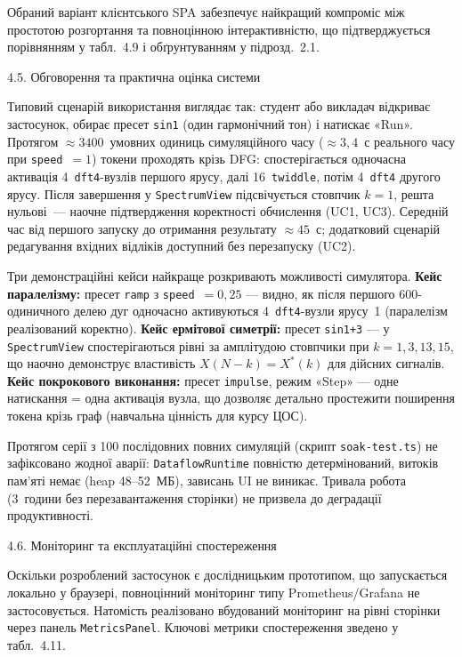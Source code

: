 Обраний варіант клієнтського SPA забезпечує найкращий компроміс між
простотою розгортання та повноцінною інтерактивністю, що підтверджується
порівнянням у табл.~4.9 і обґрунтуванням у підрозд.~2.1.

\protect{}\label{_Toc229681182}{}4.5. Обговорення та
практична оцінка системи

Типовий сценарій використання виглядає так: студент або викладач
відкриває застосунок, обирає пресет \texttt{sin1} (один гармонічний
тон) і натискає «Run». Протягом \(\approx3400\)~умовних одиниць
симуляційного часу (\(\approx3{,}4\)~с реального часу при
\texttt{speed}~\(=1\)) токени проходять крізь DFG: спостерігається
одночасна активація 4~\texttt{dft4}-вузлів першого ярусу, далі
16~\texttt{twiddle}, потім 4~\texttt{dft4} другого ярусу. Після
завершення у \texttt{SpectrumView} підсвічується стовпчик \(k=1\),
решта нульові~--- наочне підтвердження коректності обчислення (UC1,
UC3). Середній час від першого запуску до отримання результату
\(\approx45\)~с; додатковий сценарій редагування вхідних відліків
доступний без перезапуску (UC2).

Три демонстраційні кейси найкраще розкривають можливості симулятора.
\textbf{Кейс паралелізму:} пресет \texttt{ramp} з \texttt{speed}~\(=0{,}25\) ---
видно, як після першого 600-одиничного делею дуг одночасно активуються
4~\texttt{dft4}-вузли ярусу~1 (паралелізм реалізований коректно).
\textbf{Кейс ермітової симетрії:} пресет \texttt{sin1+3} --- у
\texttt{SpectrumView} спостерігаються рівні за амплітудою стовпчики при
\(k=1,3,13,15\), що наочно демонструє властивість \(X(N-k)=X^*(k)\) для
дійсних сигналів. \textbf{Кейс покрокового виконання:} пресет
\texttt{impulse}, режим «Step» --- одне натискання = одна активація
вузла, що дозволяє детально простежити поширення токена крізь граф
(навчальна цінність для курсу ЦОС).

Протягом серії з 100 послідовних повних симуляцій (скрипт
\texttt{soak-test.ts}) не зафіксовано жодної аварії:
\texttt{DataflowRuntime} повністю детермінований, витоків пам'яті немає
(heap 48--52~МБ), зависань UI не виникає. Тривала робота (3~години без
перезавантаження сторінки) не призвела до деградації продуктивності.

\protect{}\label{_Toc229681187}{}4.6. Моніторинг та
експлуатаційні спостереження

Оскільки розроблений застосунок є дослідницьким прототипом, що
запускається локально у браузері, повноцінний моніторинг типу
Prometheus/Grafana не застосовується. Натомість реалізовано вбудований
моніторинг на рівні сторінки через панель \texttt{MetricsPanel}. Ключові
метрики спостереження зведено у табл.~4.11.


